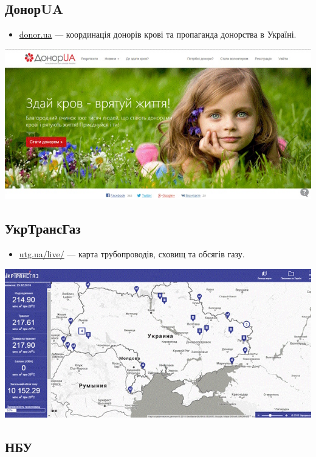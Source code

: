 \subsection{ДонорUA}

\begin{itemize}
    \item \href{http://donor.ua/}{donor.ua} — координація донорів крові та пропаганда донорства в Україні.
\end{itemize}

\includegraphics{images/018.jpg}

\subsection{УкрТрансГаз}

\begin{itemize}
    \item \href{http://utg.ua/live/}{utg.ua/live/} — карта трубопроводів, сховищ та обсягів газу.
\end{itemize}

\includegraphics{images/019.jpg}

\subsection{НБУ}

